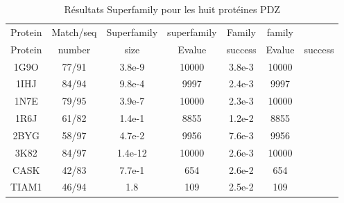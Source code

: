     \begin{table}[h]
           \raggedleft{}

      \begin{tabular}{cccccc}

        \toprule
        Protein & Match/seq & Superfamily & superfamily & Family & family \\
        Protein & number & size & Evalue & success & Evalue &  success\\
        1G9O  & 77/91 &  3.8e-9  & 10000 & 3.8e-3 & 10000 \\
        1IHJ  & 84/94 &  9.8e-4  &  9997 & 2.4e-3 &  9997 \\
        1N7E  & 79/95 &  3.9e-7  & 10000 & 2.3e-3 & 10000 \\
        1R6J  & 61/82 &  1.4e-1  &  8855 & 1.2e-2 &  8855 \\
        2BYG  & 58/97 &  4.7e-2  &  9956 & 7.6e-3 &  9956 \\
        3K82  & 84/97 & 1.4e-12  & 10000 & 2.6e-3 & 10000 \\
        CASK  & 42/83 &  7.7e-1  &   654 & 2.6e-2 &   654 \\
        TIAM1 & 46/94 &     1.8  &   109 & 2.5e-2 &   109 \\
        \bottomrule        
      \end{tabular}   
     \caption{Résultats Superfamily pour les huit protéines PDZ}   
\label{tab:superfamily_bestRE}       
\end{table}






